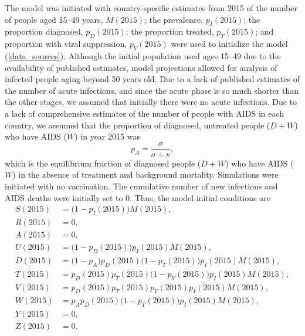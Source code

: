 \documentclass{article}
\begin{document}
The model was initiated with country-specific estimates from 2015 of
the number of people aged 15--49 years, $M(2015)$; the prevalence,
$p_I(2015)$; the proportion diagnosed, $p_D(2015)$; the proportion
treated, $p_T(2015)$; and proportion with viral suppression,
$p_V(2015)$ were used to initialize the model
(\autoref{data_sources}).  Although the initial population used ages
15--49 due to the availability of published estimates, model
projections allowed for analysis of infected people aging beyond 50
years old.  Due to a lack of published estimates of the number of
acute infections, and since the acute phase is so much shorter than
the other stages, we assumed that initially there were no acute
infections.  Due to a lack of comprehensive estimates of the number of
people with AIDS in each country, we assumed that the proportion of
diagnosed, untreated people ($D + W$) who have AIDS ($W$) in year 2015
was
\begin{equation}
  p_A = \frac{\sigma}{\sigma + \nu},
\end{equation}
which is the equilibrium fraction of diagnosed people ($D + W$) who
have AIDS ($W$) in the absence of treatment and background mortality.
Simulations were initiated with no vaccination.  The cumulative number
of new infections and AIDS deaths were initially set to 0.  Thus, the
model initial conditions are
\begin{equation}
  \label{initial_conditions}
  \begin{split}
    S(2015) &= \big(1 - p_I(2015)\big) M(2015), \\
    R(2015) &= 0, \\
    A(2015) &= 0, \\
    U(2015) &= \big(1 - p_D(2015)\big) p_I(2015) M(2015), \\
    D(2015) &= \big(1 - p_A\big) p_D(2015) \big(1 - p_T(2015)\big)
    p_I(2015) M(2015), \\
    T(2015) &= p_D(2015) p_T(2015) \big(1 - p_V(2015)\big)
    p_I(2015) M(2015), \\
    V(2015) &= p_D(2015) p_T(2015) p_V(2015) p_I(2015) M(2015), \\
    W(2015) &= p_A p_D(2015) \big(1 - p_T(2015)\big) p_I(2015) M(2015), \\
    Y(2015) &= 0, \\
    Z(2015) &= 0.
  \end{split}
\end{equation}
\end{document}
